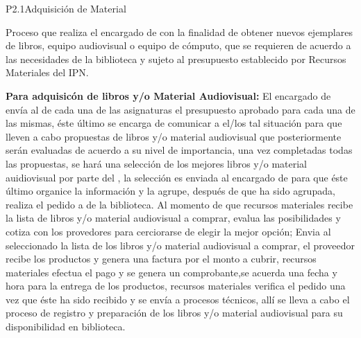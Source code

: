 
\begin{Proceso}{P2.1}{Adquisición de Material} {
  

  Proceso que realiza el encargado de  con la finalidad de obtener nuevos ejemplares de libros, equipo audiovisual o equipo de cómputo, que se requieren de acuerdo a las necesidades  de la biblioteca y sujeto al presupuesto establecido por Recursos Materiales del IPN.\vspace{5mm}
  
\textbf{Para adquisicón de libros y/o Material Audiovisual:} El encargado de  envía al  de cada una de las asignaturas el presupuesto aprobado para cada una de las mismas, éste último se encarga de comunicar a el/los  tal situación para que lleven a cabo propuestas de libros y/o material audiovisual que posteriormente serán evaluadas de acuerdo a su nivel de importancia, una vez completadas todas las propuestas, se hará una selección de los mejores libros y/o material auidiovisual por parte del , la selección es enviada al encargado de  para que éste último organice la información y la agrupe, después de que ha sido agrupada, realiza el pedido a  de la biblioteca. Al momento de que recursos materiales recibe la lista de libros y/o material audiovisual a comprar, evalua las posibilidades y cotiza con los provedores para cerciorarse de elegir la mejor opción; Envia al  seleccionado la lista de los libros y/o material audiovisual a comprar, el proveedor recibe los productos y genera una factura por el monto a cubrir, recursos materiales efectua el pago y se genera un comprobante,se acuerda una fecha y hora para la entrega de los productos, recursos materiales verifica el pedido una vez que éste ha sido recibido y se envía a procesos técnicos, allí se lleva a cabo el proceso de registro y preparación de los libros y/o material audiovisual para su disponibilidad en biblioteca.
\vspace{5mm}

}
\end{Proceso}
